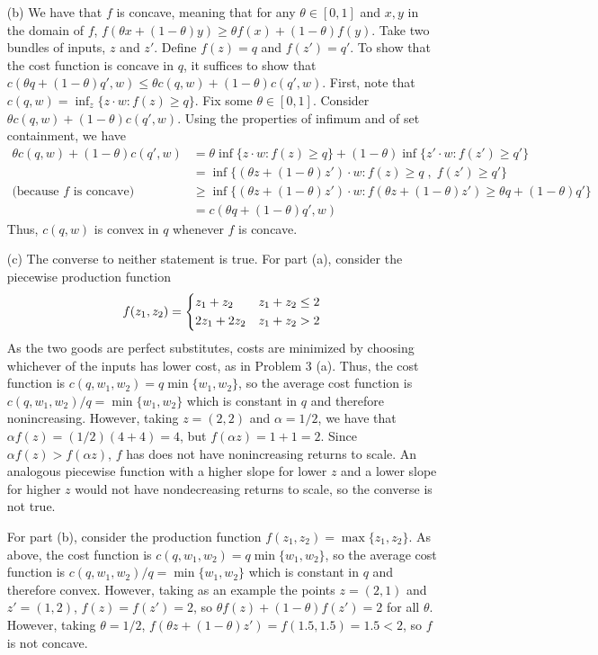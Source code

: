 \documentclass[12pt]{article}
\begin{document}
\begin{itemize}
    \item[(b)] We have that $f$ is concave, meaning that for any $\theta \in [0,1]$ and $x,y$ in the domain of $f$, $f(\theta x + (1-\theta)y) \ge \theta f(x) + (1-\theta) f(y)$. Take two bundles of inputs, $z$ and $z'$. Define $f(z) = q$ and $f(z') = q'$. To show that the cost function is concave in $q$, it suffices to show that $c(\theta q + (1-\theta)q',w) \le \theta c(q,w) + (1-\theta)c(q',w)$. First, note that $c(q,w) = \inf_z\{z\cdot w : f(z) \ge q\}$. Fix some $\theta \in [0,1]$. Consider $\theta c(q,w) + (1-\theta) c(q',w)$. Using the properties of infimum and of set containment, we have
    \begin{align*}
    \theta c(q,w) + (1-\theta) c(q',w) &= \theta \inf\{z \cdot w : f(z) \ge q\} + (1-\theta) \inf\{z' \cdot w : f(z') \ge q'\} \\
    &= \inf\{(\theta z + (1-\theta)z')\cdot w : f(z) \ge q \; , \; f(z') \ge q'\} \\ 
    \text{(because $f$ is concave)} &\ge \inf\{(\theta z + (1-\theta)z')\cdot w : f(\theta z + (1-\theta) z') \ge \theta q + (1-\theta)q'\} \\
    &= c(\theta q + (1-\theta)q',w)
    \end{align*}
    Thus, $c(q,w)$ is convex in $q$ whenever $f$ is concave.

    \item[(c)] The converse to neither statement is true. For part (a), consider the piecewise production function 
    \[
    f(z_1,z_2) = \begin{dcases} z_1 + z_2 & z_1 + z_2 \le 2 \\ 2z_1 + 2z_2 & z_1 + z_2 > 2 \end{dcases}
    \]
    As the two goods are perfect substitutes, costs are minimized by choosing whichever of the inputs has lower cost, as in Problem 3 (a). Thus, the cost function is $c(q,w_1,w_2) = q\min\{w_1,w_2\}$, so the average cost function is $c(q,w_1,w_2)/ q = \min\{w_1,w_2\}$ which is constant in $q$ and therefore nonincreasing. However, taking $z = (2,2)$ and $\alpha = 1/2$, we have that $\alpha f(z) = (1/2)(4 + 4) = 4$, but $f(\alpha z) = 1 + 1 = 2$. Since $\alpha f(z) > f(\alpha z)$, $f$ has does not have nonincreasing returns to scale. An analogous piecewise function with a higher slope for lower $z$ and a lower slope for higher $z$ would not have nondecreasing returns to scale, so the converse is not true.

    \medskip

    For part (b), consider the production function $f(z_1,z_2) = \max\{z_1,z_2\}$. As above, the cost function is $c(q,w_1,w_2) = q\min\{w_1,w_2\}$, so the average cost function is $c(q,w_1,w_2)/ q = \min\{w_1,w_2\}$ which is constant in $q$ and therefore convex. However, taking as an example the points $z = (2,1)$ and $z' = (1,2)$, $f(z) = f(z') = 2$, so $\theta f(z) + (1-\theta) f(z') = 2$ for all $\theta$. However, taking $\theta = 1/2$, $f(\theta z + (1-\theta)z') = f(1.5,1.5) = 1.5 < 2$, so $f$ is not concave.
\end{itemize}
\end{document}
